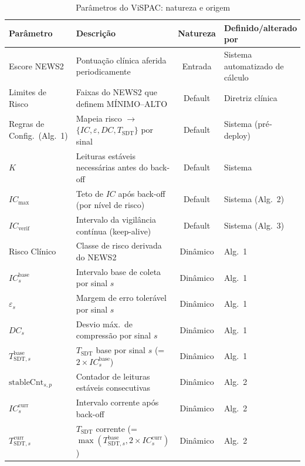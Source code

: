 \documentclass[twoside,english,brazilian]{UNISINOSmonografia}
\begin{document}
\begin{table}[!ht]
\centering
\caption{Parâmetros do ViSPAC: natureza e origem}
\label{tab:parametros_sistema_resumido}
\renewcommand{\arraystretch}{1.2}
\small
\begin{tabular}{|p{3cm}|p{4cm}|c|l|}
\hline
\textbf{Parâmetro} & \textbf{Descrição} & \textbf{Natureza} & \textbf{Definido/alterado por} \\ \hline
Escore NEWS2 & Pontuação clínica aferida periodicamente & Entrada & Sistema automatizado de cálculo \\ \hline
Limites de Risco & Faixas do NEWS2 que definem MÍNIMO–ALTO & Default & Diretriz clínica \\ \hline
Regras de Config.\ (Alg.~1) & Mapeia risco $\rightarrow$ $\{IC,\varepsilon,DC,T_{\text{SDT}}\}$ por sinal & Default & Sistema (pré‐deploy) \\ \hline
$K$ & Leituras estáveis necessárias antes do back-off & Default & Sistema \\ \hline
$IC_{\text{max}}$ & Teto de $IC$ após back-off (por nível de risco) & Default & Sistema (Alg.~2) \\ \hline
$IC_{\text{verif}}$ & Intervalo da vigilância contínua (keep-alive) & Default & Sistema (Alg.~3) \\ \hline
Risco Clínico & Classe de risco derivada do NEWS2 & Dinâmico & Alg.~1 \\ \hline
$IC^{\text{base}}_{s}$ & Intervalo base de coleta por sinal $s$ & Dinâmico & Alg.~1 \\ \hline
$\varepsilon_{s}$ & Margem de erro tolerável por sinal $s$ & Dinâmico & Alg.~1 \\ \hline
$DC_{s}$ & Desvio máx.\ de compressão por sinal $s$ & Dinâmico & Alg.~1 \\ \hline
$T_{\text{SDT},s}^{\text{base}}$ & $T_{\text{SDT}}$ base por sinal $s$ (= $2 \times IC^{\text{base}}_{s}$) & Dinâmico & Alg.~1 \\ \hline
$\text{stableCnt}_{s,p}$ & Contador de leituras estáveis consecutivas & Dinâmico & Alg.~2 \\ \hline
$IC^{\text{curr}}_{s}$ & Intervalo corrente após back-off & Dinâmico & Alg.~2 \\ \hline
$T_{\text{SDT},s}^{\text{curr}}$ & $T_{\text{SDT}}$ corrente (= $\max(T_{\text{SDT},s}^{\text{base}}, 2 \times IC^{\text{curr}}_{s})$) & Dinâmico & Alg.~2 \\ \hline
\end{tabular}
\end{table}
\end{document}
